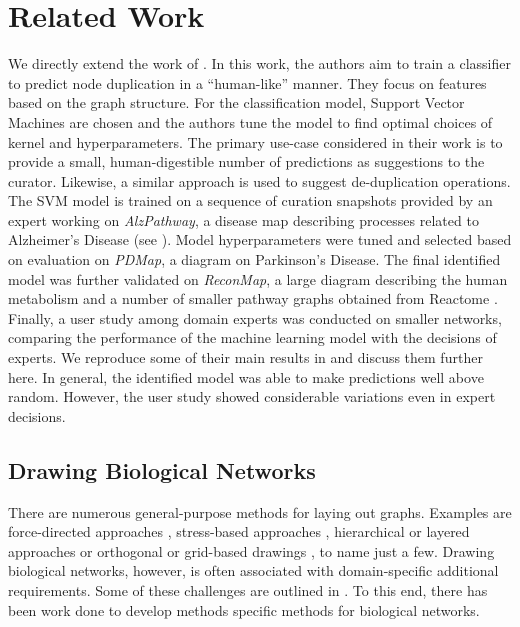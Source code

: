 \documentclass[
	fontsize=10pt, %
	twoside=false, %
	secnumdepth=1, %
  toc=indentunnumbered %
]{kaobook}
\begin{document}
\chapter{Related Work}
\label{sec:related-work}
We directly extend the work of \citeauthor{nielsen_MachineLearningSupport_2019}
\cite{nielsen_MachineLearningSupport_2019}. In this work, the authors aim to
train a classifier to predict node duplication in a ``human-like'' manner. They
focus on features based on the graph structure. For the classification model,
Support Vector Machines are chosen and the authors tune the model to find
optimal choices of kernel and hyperparameters. The primary use-case considered
in their work is to provide a small, human-digestible number of predictions as
suggestions to the curator. Likewise, a similar approach is used to suggest
de-duplication operations. The SVM model is trained on a sequence of curation
snapshots provided by an expert working on \textit{AlzPathway}, a disease map
describing processes related to Alzheimer's Disease (see ).
Model hyperparameters were tuned and selected based on evaluation on
\textit{PDMap}, a diagram on Parkinson's Disease. The final identified model was
further validated on \textit{ReconMap}, a large diagram describing the human
metabolism and a number of smaller pathway graphs obtained from Reactome
\cite{joshi-tope_ReactomeKnowledgebaseBiological_2005}. Finally, a user study
among domain experts was conducted on smaller networks, comparing the
performance of the machine learning model
with the decisions of experts. We reproduce some of their main results in
 and discuss them further here. In general, the
identified model was able to make predictions well above random. However, the
user study showed considerable variations even in expert decisions.



\section{Drawing Biological Networks}

There are numerous general-purpose methods for laying out graphs. Examples are
force-directed approaches \cite{kobourov_ForceDirectedDrawingAlgorithms_2013},
stress-based approaches \cite{gansner_GraphDrawingStress_2005}, hierarchical or
layered approaches \cite{healy_HierarchicalDrawingAlgorithms_2013} or orthogonal
or grid-based drawings \cite{duncan_PlanarOrthogonalPolyline_2013}, to name just
a few. Drawing biological networks, however, is often associated with
domain-specific additional requirements. Some of these challenges are outlined
in . To this end, there has been work done to develop
methods specific methods for biological networks.
\end{document}
